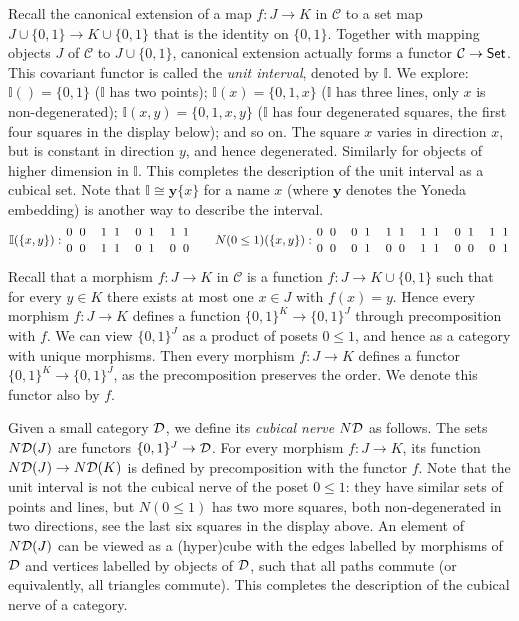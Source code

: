 \documentclass[10pt,a4paper]{article}
\newcommand{\CC}{{\mathcal C}}
\newcommand{\set}[1]{\{#1\}}
\newcommand{\yoneda}{\mathbf{y}}
\newcommand{\interval}{\mathbb{I}}
\newcommand{\DD}{{\cal D}}
\newcommand{\ND}{N\DD}
\begin{document}
Recall the canonical extension of a map $f:J\to K$ in $\CC$ to a set
map $J \cup \set{0,1} \to K\cup \set{0,1}$ that is the identity on
$\set{0,1}$.  Together with mapping objects $J$ of $\CC$ to $J \cup
\set{0,1}$, canonical extension actually forms a functor $\CC\to{\sf
  Set}$.  This covariant functor is called the \emph{unit interval},
denoted by $\interval$.  We explore: $\interval()=\set{0,1}$
($\interval$ has two points); $\interval(x)=\set{0,1,x}$ ($\interval$
has three lines, only $x$ is non-degenerated); $\interval(x,y) =
\set{0,1,x,y}$ ($\interval$ has four degenerated squares, the first
four squares in the display below); and so on.  The square $x$ varies
in direction $x$, but is constant in direction $y$, and hence
degenerated.  Similarly for objects of higher dimension in
$\interval$.  This completes the description of the unit interval as a
cubical set.  Note that $\interval \cong \yoneda \set{x}$ for a name
$x$ (where $\yoneda$ denotes the Yoneda embedding) is another way to
describe the interval.
\[
\def\olll{{1 \atop 0} ~ {1 \atop 1}}
\def\oool{{0 \atop 0} ~ {1 \atop 0}}
\def\oooo{{0 \atop 0} ~ {0 \atop 0}}
\def\llll{{1 \atop 1} ~ {1 \atop 1}}
\def\olol{{1 \atop 0} ~ {1 \atop 0}}
\def\ooll{{0 \atop 0} ~ {1 \atop 1}}
\def\Fxy{{0 \atop 0} ~ {0 \atop 0}}
\def\Txy{{1 \atop 1} ~ {1 \atop 1}}
\def\Iy{{1 \atop 0} ~ {1 \atop 0}}
\def\Ix{{0 \atop 0} ~ {1 \atop 1}}
\interval(\set{x,y}):\Fxy\quad\Txy\quad\Ix\quad\Iy\quad\quad
N(0\leq1)(\set{x,y}):\oooo\quad\ooll\quad\olol\quad\llll\quad\oool\quad\olll\]

Recall that a morphism $f:J\to K$ in $\CC$ is a function $f:J\to
K\cup\set{0,1}$ such that for every $y\in K$ there exists at most one
$x\in J$ with $f(x)=y$.  Hence every morphism $f:J\to K$ defines a
function $\set{0,1}^K \to \set{0,1}^J$ through precomposition with
$f$.  We can view $\set{0,1}^J$ as a product of posets $0\leq1$, and
hence as a category with unique morphisms.  Then every morphism
$f:J\to K$ defines a functor $\set{0,1}^K \to \set{0,1}^J$, as the
precomposition preserves the order.  We denote this functor also by
$f$.

Given a small category $\DD$, we define its \emph{cubical nerve} $\ND$
as follows. The sets $\ND(J)$ are functors $\set{0,1}^J \to\DD$.  For
every morphism $f:J\to K$, its function $\ND(J)\to\ND(K)$ is defined
by precomposition with the functor $f$.  Note that the unit interval
is not the cubical nerve of the poset $0\leq1$: they have similar sets
of points and lines, but $N(0\leq1)$ has two more squares, both
non-degenerated in two directions, see the last six squares in the
display above.  An element of $\ND(J)$ can be viewed as a (hyper)cube
with the edges labelled by morphisms of $\DD$ and vertices labelled by
objects of $\DD$, such that all paths commute (or equivalently, all
triangles commute).  This completes the description of the cubical
nerve of a category.
\end{document}
